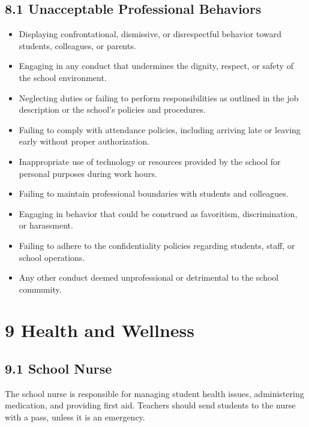 \documentclass[11pt]{article}
\begin{document}
\subsection{8.1 Unacceptable Professional Behaviors}
\label{sec:orgb996c2c}

\begin{itemize}
\item Displaying confrontational, dismissive, or disrespectful behavior toward students, colleagues, or parents.

\item Engaging in any conduct that undermines the dignity, respect, or safety of the school environment.

\item Neglecting duties or failing to perform responsibilities as outlined in the job description or the school’s policies and procedures.

\item Failing to comply with attendance policies, including arriving late or leaving early without proper authorization.

\item Inappropriate use of technology or resources provided by the school for personal purposes during work hours.

\item Failing to maintain professional boundaries with students and colleagues.

\item Engaging in behavior that could be construed as favoritism, discrimination, or harassment.

\item Failing to adhere to the confidentiality policies regarding students, staff, or school operations.

\item Any other conduct deemed unprofessional or detrimental to the school community.
\end{itemize}

\section{9 Health and Wellness}
\label{sec:org81107e6}

\subsection{9.1 School Nurse}
\label{sec:org4166b4e}

The school nurse is responsible for managing student health issues, administering medication, and providing first aid. Teachers should send students to the nurse with a pass, unless it is an emergency.
\end{document}
